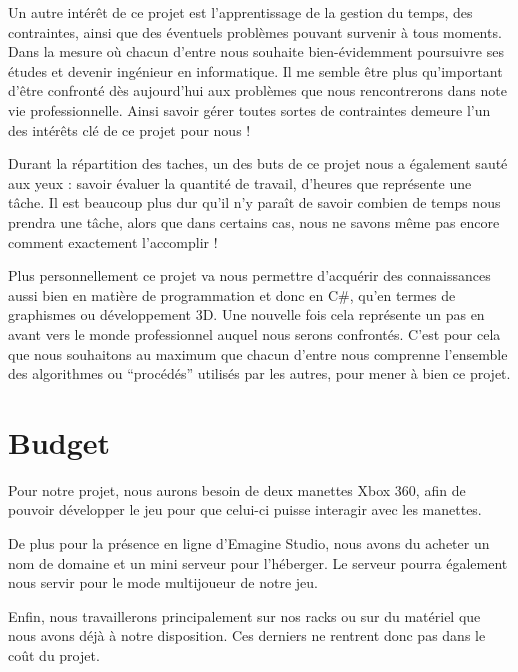\documentclass[a4paper, 11pt]{report}
\begin{document}
Un autre intérêt de ce projet est l'apprentissage de la gestion du temps, des contraintes, ainsi que des éventuels problèmes pouvant survenir à tous moments. Dans la mesure où chacun d'entre nous souhaite bien-évidemment poursuivre ses études et devenir ingénieur en informatique. Il me semble être plus qu'important d'être confronté dès aujourd'hui aux problèmes que nous rencontrerons dans note vie professionnelle. Ainsi savoir gérer toutes sortes de contraintes demeure l'un des intérêts clé de ce projet pour nous !

Durant la répartition des taches, un des buts de ce projet nous a également sauté aux yeux : savoir évaluer la quantité de travail, d'heures que représente une tâche. Il est beaucoup plus dur qu'il n'y paraît de savoir combien de temps nous prendra une tâche, alors que dans certains cas, nous ne savons même pas encore comment exactement l'accomplir !

Plus personnellement ce projet va nous permettre d'acquérir des connaissances aussi bien en matière de programmation et donc en C\#, qu'en termes de graphismes ou développement 3D. Une nouvelle fois cela représente un pas en avant vers le monde professionnel auquel nous serons confrontés. C'est pour cela que nous souhaitons au maximum que chacun d'entre nous comprenne l'ensemble des algorithmes ou ``procédés'' utilisés par les autres, pour mener à bien ce projet.

\newpage
\section{Budget}\label{budget}

Pour notre projet, nous aurons besoin de deux manettes Xbox 360, afin de pouvoir développer le jeu pour que celui-ci puisse interagir avec les manettes.

De plus pour la présence en ligne d'Emagine Studio, nous avons du acheter un nom de domaine et un mini serveur pour l'héberger. Le serveur pourra également nous servir pour le mode multijoueur de notre jeu.

Enfin, nous travaillerons principalement sur nos racks ou sur du matériel que nous avons déjà à notre disposition. Ces derniers ne rentrent donc pas dans le coût du projet.
\newline
\end{document}
